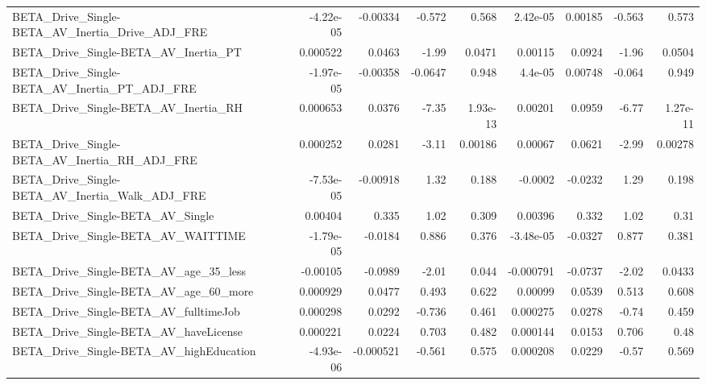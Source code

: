 \begin{tabular}{lrrrrrrrr}
BETA\_Drive\_Single-BETA\_AV\_Inertia\_Drive\_ADJ\_FRE    &   -4.22e-05 &     -0.00334 &   -0.572 &    0.568 &   2.42e-05 &     0.00185 &       -0.563 &         0.573 \\
BETA\_Drive\_Single-BETA\_AV\_Inertia\_PT               &    0.000522 &       0.0463 &    -1.99 &   0.0471 &    0.00115 &      0.0924 &        -1.96 &        0.0504 \\
BETA\_Drive\_Single-BETA\_AV\_Inertia\_PT\_ADJ\_FRE       &   -1.97e-05 &     -0.00358 &  -0.0647 &    0.948 &    4.4e-05 &     0.00748 &       -0.064 &         0.949 \\
BETA\_Drive\_Single-BETA\_AV\_Inertia\_RH               &    0.000653 &       0.0376 &    -7.35 & 1.93e-13 &    0.00201 &      0.0959 &        -6.77 &      1.27e-11 \\
BETA\_Drive\_Single-BETA\_AV\_Inertia\_RH\_ADJ\_FRE       &    0.000252 &       0.0281 &    -3.11 &  0.00186 &    0.00067 &      0.0621 &        -2.99 &       0.00278 \\
BETA\_Drive\_Single-BETA\_AV\_Inertia\_Walk\_ADJ\_FRE     &   -7.53e-05 &     -0.00918 &     1.32 &    0.188 &    -0.0002 &     -0.0232 &         1.29 &         0.198 \\
BETA\_Drive\_Single-BETA\_AV\_Single                   &     0.00404 &        0.335 &     1.02 &    0.309 &    0.00396 &       0.332 &         1.02 &          0.31 \\
BETA\_Drive\_Single-BETA\_AV\_WAITTIME                 &   -1.79e-05 &      -0.0184 &    0.886 &    0.376 &  -3.48e-05 &     -0.0327 &        0.877 &         0.381 \\
BETA\_Drive\_Single-BETA\_AV\_age\_35\_less              &    -0.00105 &      -0.0989 &    -2.01 &    0.044 &  -0.000791 &     -0.0737 &        -2.02 &        0.0433 \\
BETA\_Drive\_Single-BETA\_AV\_age\_60\_more              &    0.000929 &       0.0477 &    0.493 &    0.622 &    0.00099 &      0.0539 &        0.513 &         0.608 \\
BETA\_Drive\_Single-BETA\_AV\_fulltimeJob              &    0.000298 &       0.0292 &   -0.736 &    0.461 &   0.000275 &      0.0278 &        -0.74 &         0.459 \\
BETA\_Drive\_Single-BETA\_AV\_haveLicense              &    0.000221 &       0.0224 &    0.703 &    0.482 &   0.000144 &      0.0153 &        0.706 &          0.48 \\
BETA\_Drive\_Single-BETA\_AV\_highEducation            &   -4.93e-06 &    -0.000521 &   -0.561 &    0.575 &   0.000208 &      0.0229 &        -0.57 &         0.569 \\

\end{tabular}

